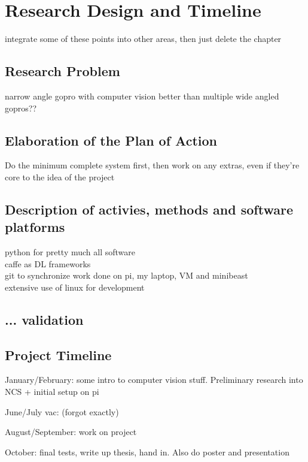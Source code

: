 \chapter{Research Design and Timeline}

{\Large \color{red} integrate some of these points into other areas, then just delete the chapter}

\section{Research Problem}
narrow angle gopro with computer vision better than multiple wide angled gopros??

\section{Elaboration of the Plan of Action}
Do the minimum complete system first, then work on any extras, even if they're core to the idea of the project


\section{Description of activies, methods and software platforms}
python for pretty much all software \\
caffe as DL frameworks \\
git to synchronize work done on pi, my laptop, VM and minibeast \\
extensive use of linux for development



\section{... validation}



\section{Project Timeline}
January/February: some intro to computer vision stuff. Preliminary research into NCS + initial setup on pi

June/July vac: (forgot exactly)

August/September: work on project

October: final tests, write up thesis, hand in. Also do poster and presentation

